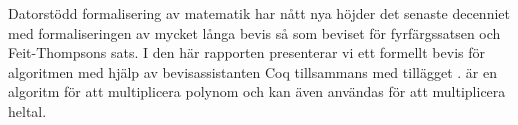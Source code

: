 Datorstödd formalisering av matematik har nått nya höjder det
senaste decenniet med formaliseringen av mycket långa bevis så
som beviset för fyrfärgssatsen och Feit-Thompsons sats. I den
här rapporten presenterar vi ett formellt bevis för algoritmen
\toom med hjälp av bevisassistanten Coq tillsammans med
tillägget \ssr. \toom är en algoritm för att multiplicera
polynom och kan även användas för att multiplicera heltal.
